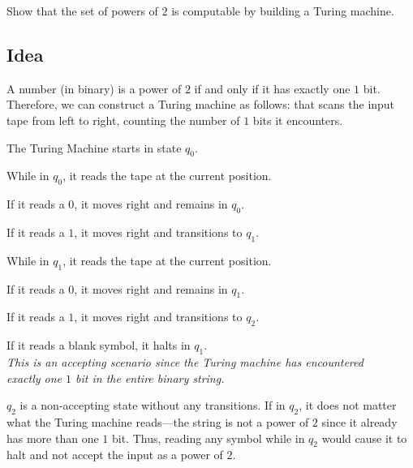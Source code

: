 \begin{problem}
  Show that the set of powers of $2$ is computable
  by building a Turing machine.

  \begin{answer}
    \subsection*{Idea}
    A number (in binary) is a power of $2$ if and only if it has exactly one $1$ bit.
    Therefore, we can construct a Turing machine as follows: that scans the input tape from left to right,
    counting the number of $1$ bits it encounters.
    \begin{enumarabic}
      \item The Turing Machine starts in state $q_0$.
      \item While in $q_0$, it reads the tape at the current position.
        \begin{enumalph}
          \item If it reads a $0$, it moves right and remains in $q_0$.
          \item If it reads a $1$, it moves right and transitions to $q_1$.
        \end{enumalph}
      \item While in $q_1$, it reads the tape at the current position.
        \begin{enumalph}
          \item If it reads a $0$, it moves right and remains in $q_1$.
          \item If it reads a $1$, it moves right and transitions to $q_2$.
          \item If it reads a blank symbol, it halts in $q_1$. \\
            \emph{
              This is an accepting scenario since the Turing machine has encountered \\
              exactly one $1$ bit in the entire binary string.
            }
        \end{enumalph}
      \item $q_2$ is a non-accepting state without any transitions. If in $q_2$,
        it does not matter what the Turing machine reads---the string is
        not a power of $2$ since it already has more than one $1$ bit.
        Thus, reading any symbol while in $q_2$ would cause it to halt
        and not accept the input as a power of $2$.
    \end{enumarabic}


\end{answer}
\end{problem}
